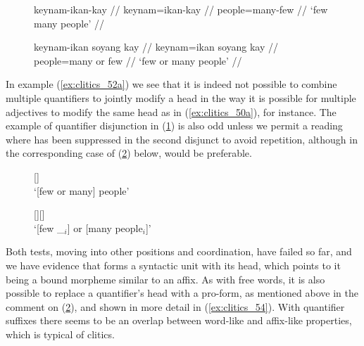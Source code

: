 \begin{figure}
\pex\label{ex:clitics_52}
\a\label{ex:clitics_52a}\ljudge{*}\begingl
	\gla keynam-ikan-kay //
	\glb keynam=ikan-kay //
	\glc people=many-few //
	\glft `few many people' //
\endgl

\a\label{ex:clitics_52b}\ljudge{\ques}\begingl
	\gla keynam-ikan soyang kay //
	\glb keynam=ikan soyang kay //
	\glc people=many or few //
	\glft `few or many people' //
\endgl
\xe
\end{figure}

In example (\ref{ex:clitics_52a}) we see that it is indeed not possible to
combine multiple quantifiers to jointly modify a head in the way it is possible
for multiple adjectives to modify the same head as in (\ref{ex:clitics_50a}),
for instance. The example of quantifier disjunction in (\ref{ex:clitics_52b})
is also odd unless we permit a reading where
 has been suppressed in the second disjunct to
avoid repetition, although in the corresponding case of (\ref{ex:clitics_53b})
below,  would be preferable.

\begin{figure}
\pex\label{ex:clitics_53}
\a\label{ex:clitics_53a}
	\ljudge{\ques\ques} \begin{minipage}[t]{\remaining}
		[] \\
		`[few or many] people'
	\end{minipage}

\a\label{ex:clitics_53b}
	\ljudge{\ques} \begin{minipage}[t]{\remaining}
		[][]	\\
		`[few \_$_i$] or [many people$_i$]'
	\end{minipage}
\xe
\end{figure}

Both tests, moving  into other positions
and coordination, have failed so far, and we have evidence that
 forms a syntactic unit with its head, which points to it
being a bound morpheme similar to an affix. As with free words, it is also
possible to replace a quantifier's head with a pro-form, as mentioned above in
the comment on (\ref{ex:clitics_53b}), and shown in more detail in
(\ref{ex:clitics_54}). With quantifier suffixes there seems to be an overlap
between word-like and affix-like properties, which is typical of clitics.

